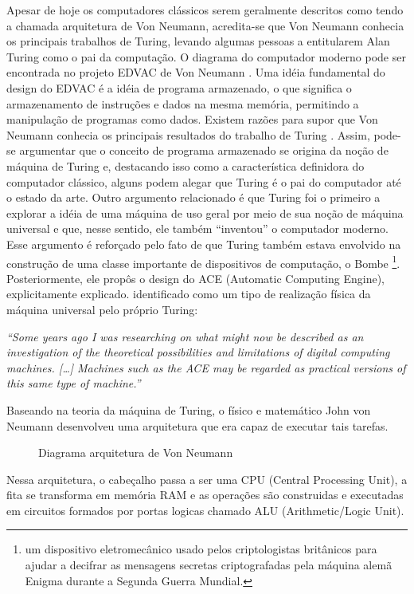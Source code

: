Apesar de hoje os computadores clássicos serem geralmente descritos como tendo a chamada arquitetura de Von Neumann, acredita-se que Von Neumann conhecia os principais trabalhos de Turing, levando algumas pessoas a entitularem Alan Turing como o pai da computação. O diagrama do computador moderno pode ser encontrada no projeto EDVAC de Von Neumann \cite{9}. Uma idéia fundamental do design do EDVAC é a idéia de programa armazenado, o que significa o armazenamento de instruções e dados na mesma memória, permitindo a manipulação de programas como dados. Existem razões para supor que Von Neumann conhecia os principais resultados do trabalho de Turing \cite{10}. Assim, pode-se argumentar que o conceito de programa armazenado se origina da noção de máquina de Turing e, destacando isso como a característica definidora do computador clássico, alguns podem alegar que Turing é o pai do computador até o estado da arte. Outro argumento relacionado é que Turing foi o primeiro a explorar a idéia de uma máquina de uso geral por meio de sua noção de máquina universal e que, nesse sentido, ele também “inventou” o computador moderno. Esse argumento é reforçado pelo fato de que Turing também estava envolvido na construção de uma classe importante de dispositivos de computação, o Bombe \footnote{um dispositivo eletromecânico usado pelos criptologistas britânicos para ajudar a decifrar as mensagens secretas criptografadas pela máquina alemã Enigma durante a Segunda Guerra Mundial.}. Posteriormente, ele propôs o design do ACE (Automatic Computing Engine), explicitamente explicado. identificado como um tipo de realização física da máquina universal pelo próprio Turing:

\textit{
  ``Some years ago I was researching on what might now be described as an investigation of the theoretical possibilities and limitations of digital computing machines. […] Machines such as the ACE may be regarded as practical versions of this same type of machine.'' \cite{11}
}

Baseando na teoria da máquina de Turing, o físico e matemático John von Neumann desenvolveu uma arquitetura que era capaz de executar tais tarefas.

\begin{figure}[H] \centering 
  \caption{\label{fig:1} Diagrama arquitetura de Von Neumann} 
\end{figure}

Nessa arquitetura, o cabeçalho passa a ser uma CPU (Central Processing Unit), a fita se transforma em memória RAM e as operações são construidas e executadas em circuitos formados por portas logicas  chamado ALU (Arithmetic/Logic Unit). \cite{12}


